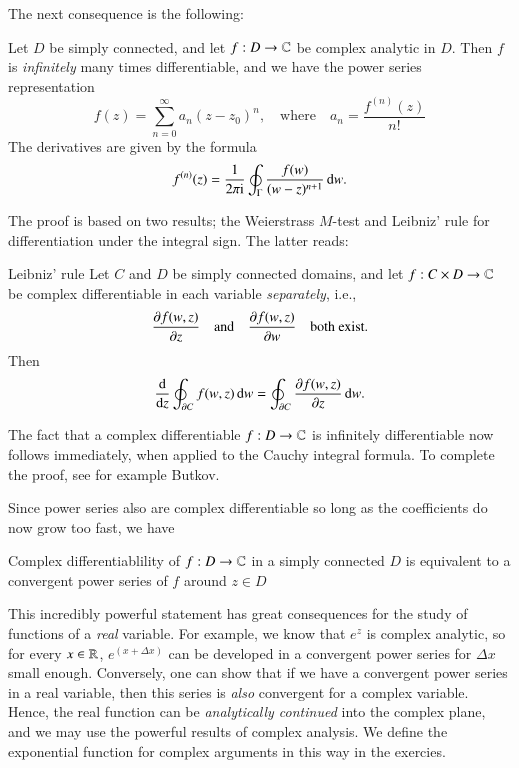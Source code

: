 The next consequence is the following:
\begin{myTheorem}{}{}
     Let $D$ be simply connected, and let $f : D \to \mathbb{C}$ be complex analytic in $D$. Then $f$ is \emph{infinitely} many times differentiable, and we have the power series representation
     \begin{equation}
        f(z) = \sum_{n=0}^\infty a_n(z-z_0)^n, \quad \text{where} \quad a_n = \frac{f^{(n)}(z)}{n!} 
     \end{equation}
     The derivatives are given by the formula
     \begin{equation}
         f^{(n)}(z) = \frac{1}{2\pi\mathrm{i}} \oint_\Gamma \frac{f(w)}{(w-z)^{n+1}} \, \mathrm{d} w.
     \end{equation}
\end{myTheorem}
The proof is based on two results; the Weierstrass $M$-test and Leibniz' rule for differentiation under the integral sign. The latter reads:
\begin{myLemma}{Leibniz' rule}{}
    Let $C$ and $D$ be simply connected domains, and let $f : C \times D \to \mathbb{C}$ be complex differentiable in each variable \emph{separately}, i.e., 
    \begin{equation}
    \frac{\partial f(w,z)}{\partial z} \quad \text{and} \quad \frac{\partial f(w,z)}{\partial w} \quad\text{both exist}. 
    \end{equation}
    Then
    \begin{equation}
        \frac{\mathrm{d} }{\mathrm{d} z} \oint_{\partial C} f(w,z)\, \mathrm{d} w =          \oint_{\partial C} \frac{\partial f(w,z)}{\partial z} \, \mathrm{d} w.
    \end{equation}
\end{myLemma}
The fact that a complex differentiable $f : D \to \mathbb{C}$ is infinitely differentiable now follows immediately, when applied to the Cauchy integral formula. To complete the proof, see for example Butkov.

Since power series also are complex differentiable so long as the coefficients do now grow too fast, we have
\begin{myTheorem}{}{}
   Complex differentiablility of $f : D \to \mathbb{C}$  in a simply connected $D$ is equivalent to a convergent power series of $f$ around $z\in D$
\end{myTheorem}
This incredibly powerful statement has great consequences for the study of functions of a \emph{real} variable. For example, we know that $e^z$ is complex analytic, so for every $x \in \mathbb{R}$, $e^(x+\Delta x)$ can be developed in a convergent power series for $\Delta x$ small enough. Conversely, one can show that if we have a convergent power series in a real variable, then this series is \emph{also} convergent for a complex variable. Hence, the real function can be \emph{analytically continued} into the complex plane, and we may use the powerful results of complex analysis. We define the exponential function for complex arguments in this way in the exercies.

